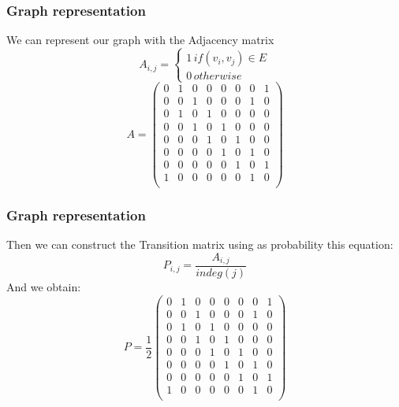\documentclass{beamer}
\begin{document}
\begin{frame}
    \frametitle{Graph representation}
    We can represent our graph with the Adjacency matrix
    \begin{equation}
        A_{i,j} = 
        \begin{cases} 
            1\, if (v_{i}, v_{j}) \in E \\
            0\, otherwise
        \end{cases}
    \end{equation}
    \begin{equation*}
        A =
        \begin{pmatrix}
        0 & 1 & 0 & 0 & 0 & 0 & 0 & 1 \\
        0 & 0 & 1 & 0 & 0 & 0 & 1 & 0 \\
        0 & 1 & 0 & 1 & 0 & 0 & 0 & 0 \\
        0 & 0 & 1 & 0 & 1 & 0 & 0 & 0 \\
        0 & 0 & 0 & 1 & 0 & 1 & 0 & 0 \\
        0 & 0 & 0 & 0 & 1 & 0 & 1 & 0 \\
        0 & 0 & 0 & 0 & 0 & 1 & 0 & 1 \\
        1 & 0 & 0 & 0 & 0 & 0 & 1 & 0 \\
        \end{pmatrix}
    \end{equation*}
\end{frame}

\begin{frame}
    \frametitle{Graph representation}
    Then we can construct the Transition matrix using as probability
    this equation:
    \begin{equation}
        P_{i,j} = \frac{A_{i,j}}{indeg(j)}
    \end{equation}
    And we obtain:    
    \begin{equation*}
        P = \frac{1}{2}
        \begin{pmatrix}
        0 & 1 & 0 & 0 & 0 & 0 & 0 & 1 \\
        0 & 0 & 1 & 0 & 0 & 0 & 1 & 0 \\
        0 & 1 & 0 & 1 & 0 & 0 & 0 & 0 \\
        0 & 0 & 1 & 0 & 1 & 0 & 0 & 0 \\
        0 & 0 & 0 & 1 & 0 & 1 & 0 & 0 \\
        0 & 0 & 0 & 0 & 1 & 0 & 1 & 0 \\
        0 & 0 & 0 & 0 & 0 & 1 & 0 & 1 \\
        1 & 0 & 0 & 0 & 0 & 0 & 1 & 0 \\
        \end{pmatrix}
    \end{equation*}
\end{frame}
\end{document}
